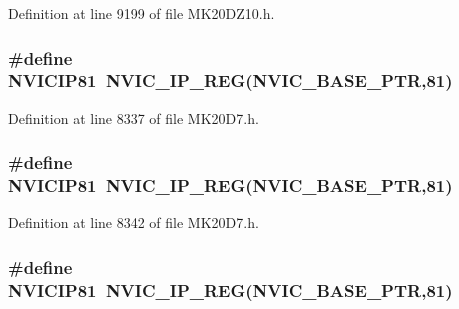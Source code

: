 Definition at line 9199 of file M\+K20\+D\+Z10.\+h.

\subsubsection[{\texorpdfstring{N\+V\+I\+C\+I\+P81}{NVICIP81}}]{\setlength{\rightskip}{0pt plus 5cm}\#define N\+V\+I\+C\+I\+P81~{\bf N\+V\+I\+C\+\_\+\+I\+P\+\_\+\+R\+EG}({\bf N\+V\+I\+C\+\_\+\+B\+A\+S\+E\+\_\+\+P\+TR},81)}\hypertarget{group___n_v_i_c___register___accessor___macros_gacd90f689c4770cc17eaa567a40062105}{}\label{group___n_v_i_c___register___accessor___macros_gacd90f689c4770cc17eaa567a40062105}


Definition at line 8337 of file M\+K20\+D7.\+h.

\subsubsection[{\texorpdfstring{N\+V\+I\+C\+I\+P81}{NVICIP81}}]{\setlength{\rightskip}{0pt plus 5cm}\#define N\+V\+I\+C\+I\+P81~{\bf N\+V\+I\+C\+\_\+\+I\+P\+\_\+\+R\+EG}({\bf N\+V\+I\+C\+\_\+\+B\+A\+S\+E\+\_\+\+P\+TR},81)}\hypertarget{group___n_v_i_c___register___accessor___macros_gacd90f689c4770cc17eaa567a40062105}{}\label{group___n_v_i_c___register___accessor___macros_gacd90f689c4770cc17eaa567a40062105}


Definition at line 8342 of file M\+K20\+D7.\+h.

\subsubsection[{\texorpdfstring{N\+V\+I\+C\+I\+P81}{NVICIP81}}]{\setlength{\rightskip}{0pt plus 5cm}\#define N\+V\+I\+C\+I\+P81~{\bf N\+V\+I\+C\+\_\+\+I\+P\+\_\+\+R\+EG}({\bf N\+V\+I\+C\+\_\+\+B\+A\+S\+E\+\_\+\+P\+TR},81)}\hypertarget{group___n_v_i_c___register___accessor___macros_gacd90f689c4770cc17eaa567a40062105}{}\label{group___n_v_i_c___register___accessor___macros_gacd90f689c4770cc17eaa567a40062105}


